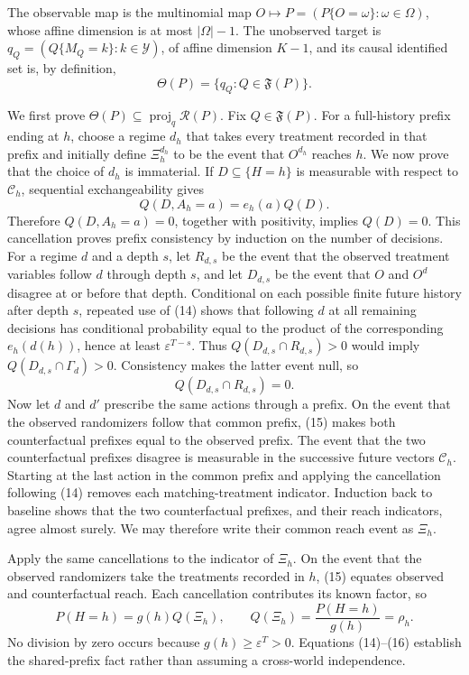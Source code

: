 The observable map is the multinomial map \(O\mapsto P=(P\{O=\omega\}:\omega\in\Omega)\), whose affine dimension is at most \(|\Omega|-1\).  The unobserved target is \(q_Q=(Q\{M_Q=k\}:k\in\mathcal Y)\), of affine dimension \(K-1\), and its causal identified set is, by definition,
\[
 \Theta(P)=\{q_Q:Q\in\mathfrak F(P)\}.                   \tag{13}
\]

We first prove \(\Theta(P)\subseteq\operatorname{proj}_q\mathcal R(P)\).  Fix \(Q\in\mathfrak F(P)\).  For a full-history prefix ending at \(h\), choose a regime \(d_h\) that takes every treatment recorded in that prefix and initially define \(\Xi_h^{d_h}\) to be the event that \(O^{d_h}\) reaches \(h\).  We now prove that the choice of \(d_h\) is immaterial.  If \(D\subseteq\{H=h\}\) is measurable with respect to \(\mathcal C_h\), sequential exchangeability gives
\[
 Q(D,A_h=a)=e_h(a)Q(D).                                   \tag{14}
\]
Therefore \(Q(D,A_h=a)=0\), together with positivity, implies \(Q(D)=0\).  This cancellation proves prefix consistency by induction on the number of decisions.  For a regime \(d\) and a depth \(s\), let \(R_{d,s}\) be the event that the observed treatment variables follow \(d\) through depth \(s\), and let \(D_{d,s}\) be the event that \(O\) and \(O^d\) disagree at or before that depth.  Conditional on each possible finite future history after depth \(s\), repeated use of (14) shows that following \(d\) at all remaining decisions has conditional probability equal to the product of the corresponding \(e_h(d(h))\), hence at least \(\varepsilon^{T-s}\).  Thus \(Q(D_{d,s}\cap R_{d,s})>0\) would imply \(Q(D_{d,s}\cap\Gamma_d)>0\).  Consistency makes the latter event null, so
\[
 Q(D_{d,s}\cap R_{d,s})=0.                                \tag{15}
\]
Now let \(d\) and \(d'\) prescribe the same actions through a prefix.  On the event that the observed randomizers follow that common prefix, (15) makes both counterfactual prefixes equal to the observed prefix.  The event that the two counterfactual prefixes disagree is measurable in the successive future vectors \(\mathcal C_h\).  Starting at the last action in the common prefix and applying the cancellation following (14) removes each matching-treatment indicator.  Induction back to baseline shows that the two counterfactual prefixes, and their reach indicators, agree almost surely.  We may therefore write their common reach event as \(\Xi_h\).

Apply the same cancellations to the indicator of \(\Xi_h\).  On the event that the observed randomizers take the treatments recorded in \(h\), (15) equates observed and counterfactual reach.  Each cancellation contributes its known factor, so
\[
 P(H=h)=g(h)Q(\Xi_h),\qquad
 Q(\Xi_h)=\frac{P(H=h)}{g(h)}=\rho_h.                     \tag{16}
\]
No division by zero occurs because \(g(h)\geq\varepsilon^{T}>0\).  Equations (14)--(16) establish the shared-prefix fact rather than assuming a cross-world independence.

